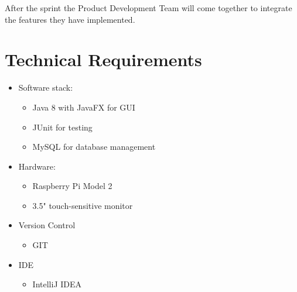 \documentclass[a4paper,12pt]{article}
\begin{document}
After the sprint the Product Development Team will come together to integrate the features they have implemented.

\section{Technical Requirements}
\begin{itemize}
	\item Software stack:
	\begin{itemize}
		\item Java 8 with JavaFX for GUI
		\item JUnit for testing
		\item MySQL for database management
	\end{itemize}
	\item Hardware:
	\begin{itemize}
		\item Raspberry Pi Model 2
		\item 3.5" touch-sensitive monitor
	\end{itemize}
	\item Version Control
	\begin{itemize}
		\item GIT
	\end{itemize}
	\item IDE
	\begin{itemize}
		\item IntelliJ IDEA
	\end{itemize}
\end{itemize}
\end{document}
